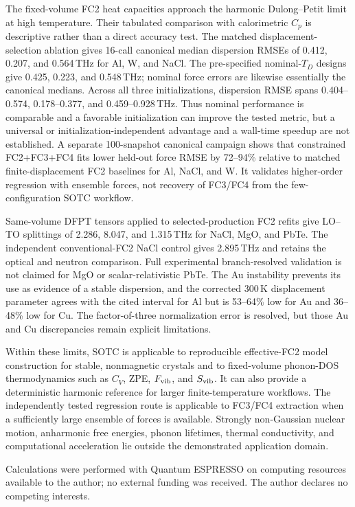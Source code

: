 \documentclass[aps,prb,reprint,amsmath,amssymb,floatfix]{revtex4-2}
\begin{document}
The fixed-volume FC2 heat capacities approach the harmonic Dulong--Petit limit at high temperature. Their tabulated comparison with calorimetric \(C_p\) is descriptive rather than a direct accuracy test.
The matched displacement-selection ablation gives 16-call canonical median
dispersion RMSEs of 0.412, 0.207, and 0.564\,THz for Al, W, and NaCl. The
pre-specified nominal-\(T_D\) designs give 0.425, 0.223, and 0.548\,THz;
nominal force errors are likewise essentially the canonical medians. Across
all three initializations, dispersion RMSE spans 0.404--0.574,
0.178--0.377, and 0.459--0.928\,THz. Thus nominal performance is comparable
and a favorable initialization can improve the tested metric, but a universal
or initialization-independent advantage and a wall-time speedup are not
established. A separate 100-snapshot canonical campaign shows
that constrained FC2+FC3+FC4 fits lower held-out force RMSE by 72--94\%
relative to matched finite-displacement FC2 baselines for Al, NaCl, and W.
It validates higher-order regression with ensemble forces, not recovery of
FC3/FC4 from the few-configuration SOTC workflow.

Same-volume DFPT tensors applied to selected-production FC2 refits give LO--TO
splittings of 2.286, 8.047, and 1.315\,THz for NaCl, MgO, and PbTe. The
independent conventional-FC2 NaCl control gives 2.895\,THz and retains the
optical and neutron comparison. Full experimental branch-resolved validation
is not claimed for MgO or scalar-relativistic PbTe. The Au
instability prevents its use as evidence of a stable dispersion, and the
corrected 300\,K displacement parameter agrees with the cited interval for Al
but is 53--64\% low for Au and 36--48\% low for Cu. The factor-of-three
normalization error is resolved, but those Au and Cu discrepancies remain
explicit limitations.

Within these limits, SOTC is applicable to reproducible effective-FC2 model
construction for stable, nonmagnetic crystals and to fixed-volume phonon-DOS
thermodynamics such as \(C_V\), ZPE, \(F_{\rm vib}\), and \(S_{\rm vib}\). It
can also provide a deterministic harmonic reference for larger
finite-temperature workflows. The independently tested regression route is
applicable to FC3/FC4 extraction when a sufficiently large ensemble of forces
is available. Strongly non-Gaussian nuclear motion, anharmonic free energies,
phonon lifetimes, thermal conductivity, and computational acceleration lie
outside the demonstrated application domain.

\begin{acknowledgments}
Calculations were performed with Quantum ESPRESSO on computing resources
available to the author; no external funding was received. The author declares
no competing interests.
\end{acknowledgments}
\end{document}

